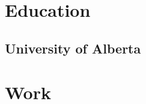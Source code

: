 \documentclass{lsanche_cv}
\begin{document}
  \section{Education}
    \subsection{University of Alberta}
  \section{Work}
\end{document}
